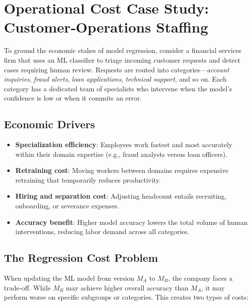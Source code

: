 \documentclass[12pt, letterpaper]{article}
\theoremstyle{remark}
\begin{document}

\section{Operational Cost Case Study: Customer‑Operations Staffing}\label{sec:staffing}

To ground the economic stakes of model regression, consider a financial services firm that uses an ML classifier to triage incoming customer requests and detect cases requiring human review.  Requests are routed into categories—\emph{account inquiries}, \emph{fraud alerts}, \emph{loan applications}, \emph{technical support}, and so on.  Each category has a dedicated team of specialists who intervene when the model’s confidence is low or when it commits an error.

\subsection{Economic Drivers}
\begin{itemize}
\item \textbf{Specialization efficiency}: Employees work fastest and most accurately within their domain expertise (e.g., fraud analysts versus loan officers).
\item \textbf{Retraining cost}: Moving workers between domains requires expensive retraining that temporarily reduces productivity.
\item \textbf{Hiring and separation cost}: Adjusting headcount entails recruiting, onboarding, or severance expenses.
\item \textbf{Accuracy benefit}: Higher model accuracy lowers the total volume of human interventions, reducing labor demand across all categories.
\end{itemize}

\subsection{The Regression Cost Problem}

When updating the ML model from version $M_A$ to $M_B$, the company faces a trade-off. While $M_B$ may achieve higher overall accuracy than $M_A$, it may perform worse on specific subgroups or categories. This creates two types of costs:
\end{document}
